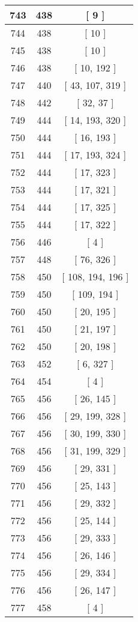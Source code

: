 \begin{center}
\begin{longtable}[H]{|| c c c ||}
\hline
743 & 438 & [ 9 ] \\ 
\hline
744 & 438 & [ 10 ] \\ 
\hline
745 & 438 & [ 10 ] \\ 
\hline
746 & 438 & [ 10, 192 ] \\ 
\hline
747 & 440 & [ 43, 107, 319 ] \\ 
\hline
748 & 442 & [ 32, 37 ] \\ 
\hline
749 & 444 & [ 14, 193, 320 ] \\ 
\hline
750 & 444 & [ 16, 193 ] \\ 
\hline
751 & 444 & [ 17, 193, 324 ] \\ 
\hline
752 & 444 & [ 17, 323 ] \\ 
\hline
753 & 444 & [ 17, 321 ] \\ 
\hline
754 & 444 & [ 17, 325 ] \\ 
\hline
755 & 444 & [ 17, 322 ] \\ 
\hline
756 & 446 & [ 4 ] \\ 
\hline
757 & 448 & [ 76, 326 ] \\ 
\hline
758 & 450 & [ 108, 194, 196 ] \\ 
\hline
759 & 450 & [ 109, 194 ] \\ 
\hline
760 & 450 & [ 20, 195 ] \\ 
\hline
761 & 450 & [ 21, 197 ] \\ 
\hline
762 & 450 & [ 20, 198 ] \\ 
\hline
763 & 452 & [ 6, 327 ] \\ 
\hline
764 & 454 & [ 4 ] \\ 
\hline
765 & 456 & [ 26, 145 ] \\ 
\hline
766 & 456 & [ 29, 199, 328 ] \\ 
\hline
767 & 456 & [ 30, 199, 330 ] \\ 
\hline
768 & 456 & [ 31, 199, 329 ] \\ 
\hline
769 & 456 & [ 29, 331 ] \\ 
\hline
770 & 456 & [ 25, 143 ] \\ 
\hline
771 & 456 & [ 29, 332 ] \\ 
\hline
772 & 456 & [ 25, 144 ] \\ 
\hline
773 & 456 & [ 29, 333 ] \\ 
\hline
774 & 456 & [ 26, 146 ] \\ 
\hline
775 & 456 & [ 29, 334 ] \\ 
\hline
776 & 456 & [ 26, 147 ] \\ 
\hline
777 & 458 & [ 4 ] \\ 

\end{longtable}
\end{center}
